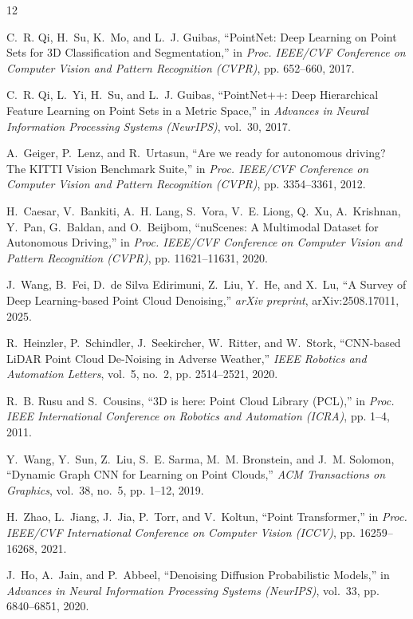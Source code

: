 \documentclass[12pt,a4paper]{article}
\begin{document}
\begin{thebibliography}{12}

C.~R. Qi, H.~Su, K.~Mo, and L.~J. Guibas, ``PointNet: Deep Learning on Point
Sets for 3D Classification and Segmentation,'' in \emph{Proc. IEEE/CVF
Conference on Computer Vision and Pattern Recognition (CVPR)}, pp. 652--660,
2017.

C.~R. Qi, L.~Yi, H.~Su, and L.~J. Guibas, ``PointNet++: Deep Hierarchical
Feature Learning on Point Sets in a Metric Space,'' in \emph{Advances in
Neural Information Processing Systems (NeurIPS)}, vol.~30, 2017.

A.~Geiger, P.~Lenz, and R.~Urtasun, ``Are we ready for autonomous driving?
The KITTI Vision Benchmark Suite,'' in \emph{Proc. IEEE/CVF Conference on
Computer Vision and Pattern Recognition (CVPR)}, pp. 3354--3361, 2012.

H.~Caesar, V.~Bankiti, A.~H. Lang, S.~Vora, V.~E. Liong, Q.~Xu, A.~Krishnan,
Y.~Pan, G.~Baldan, and O.~Beijbom, ``nuScenes: A Multimodal Dataset for
Autonomous Driving,'' in \emph{Proc. IEEE/CVF Conference on Computer Vision
and Pattern Recognition (CVPR)}, pp. 11621--11631, 2020.

J.~Wang, B.~Fei, D.~de Silva Edirimuni, Z.~Liu, Y.~He, and X.~Lu, ``A Survey
of Deep Learning-based Point Cloud Denoising,'' \emph{arXiv preprint},
arXiv:2508.17011, 2025.

R.~Heinzler, P.~Schindler, J.~Seekircher, W.~Ritter, and W.~Stork,
``CNN-based LiDAR Point Cloud De-Noising in Adverse Weather,'' \emph{IEEE
Robotics and Automation Letters}, vol.~5, no.~2, pp. 2514--2521, 2020.

R.~B. Rusu and S.~Cousins, ``3D is here: Point Cloud Library (PCL),'' in
\emph{Proc. IEEE International Conference on Robotics and Automation (ICRA)},
pp. 1--4, 2011.

Y.~Wang, Y.~Sun, Z.~Liu, S.~E. Sarma, M.~M. Bronstein, and J.~M. Solomon,
``Dynamic Graph CNN for Learning on Point Clouds,'' \emph{ACM Transactions on
Graphics}, vol.~38, no.~5, pp. 1--12, 2019.

H.~Zhao, L.~Jiang, J.~Jia, P.~Torr, and V.~Koltun, ``Point Transformer,'' in
\emph{Proc. IEEE/CVF International Conference on Computer Vision (ICCV)},
pp. 16259--16268, 2021.

J.~Ho, A.~Jain, and P.~Abbeel, ``Denoising Diffusion Probabilistic Models,''
in \emph{Advances in Neural Information Processing Systems (NeurIPS)},
vol.~33, pp. 6840--6851, 2020.


\end{thebibliography}
\end{document}
